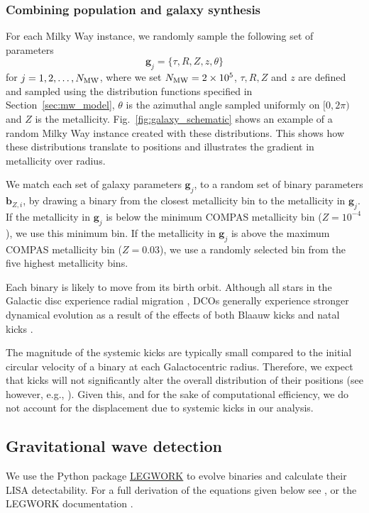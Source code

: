 \subsubsection{Combining population and galaxy synthesis}\label{sec:combining_pop_gal}

For each Milky Way instance, we randomly sample the following set of parameters
\begin{equation}
    \mathbf{g}_{{j}} = \{\tau, R, Z, z, \theta\}
\end{equation}
for $j = 1, 2, \dots, N_{\rm MW}$, where we set $N_{\rm MW} = 2 \times 10^{5}$, $\tau, R, Z$ and $z$ are defined and sampled using the distribution functions specified in Section~\ref{sec:mw_model}, $\theta$ is the azimuthal angle sampled uniformly on $[0, 2\pi)$ and $Z$ is the metallicity. Fig.~\ref{fig:galaxy_schematic} shows an example of a random Milky Way instance created with these distributions. This shows how these distributions translate to positions and illustrates the gradient in metallicity over radius.

We match each set of galaxy parameters $\mathbf{g}_{{j}}$, to a random set of binary parameters $\mathbf{b}_{{Z, i}}$, by drawing a binary from the closest metallicity bin to the metallicity in $\mathbf{g}_{{j}}$. If the metallicity in $\mathbf{g}_{{j}}$ is below the minimum COMPAS metallicity bin ($Z = 10^{-4}$), we use this minimum bin. If the metallicity in $\mathbf{g}_{{j}}$ is above the maximum COMPAS metallicity bin ($Z = 0.03$), we use a randomly selected bin from the five highest metallicity bins.

Each binary is likely to move from its birth orbit. Although all stars in the Galactic disc experience radial migration \citep{Sellwood+2002, Frankel+2018}, DCOs generally experience stronger dynamical evolution as a result of the effects of both Blaauw kicks \citep{Blaauw+1961} and natal kicks \citep[e.g.][]{Hobbs+2005}.

The magnitude of the systemic kicks are typically small compared to the initial circular velocity of a binary at each Galactocentric radius. Therefore, we expect that kicks will not significantly alter the overall distribution of their positions (see however, e.g., \citealt{Brandt+1995, Abbott+2017_GW170817_progenitor}). Given this, and for the sake of computational efficiency, we do not account for the displacement due to systemic kicks in our analysis.

\subsection{Gravitational wave detection}\label{sec:gw_detection}
We use the Python package \href{https://legwork.readthedocs.io/en/latest/}{LEGWORK} \citep{Wagg+2021} to evolve binaries and calculate their LISA detectability. For a full derivation of the equations given below see \citep[][Section~3]{Wagg+2021}, or the LEGWORK documentation \href{https://legwork.readthedocs.io/en/latest/notebooks/Derivations.html}{\faBook}.

